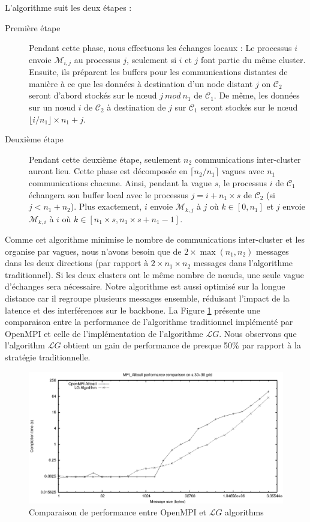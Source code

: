 L'algorithme suit les deux étapes : 
\begin{description}
	\item[Première étape] Pendant cette phase, nous effectuons les échanges locaux : Le processus $i$  envoie ${\mathcal M}_{i,j}$ au processus $j$, seulement si $i$ et $j$ font partie du même cluster. Ensuite, ils préparent les buffers pour les communications distantes de manière à ce que les données à destination d'un node distant $j$ on ${\mathcal C}_2$ seront d'abord stockés sur le n{\oe}ud $j~ mod~ n_1$ de ${\mathcal C}_1$. De même, les données sur un n{\oe}ud $i$ de ${\mathcal C}_2$ à destination de $j$ sur ${\mathcal C}_1$ seront stockés sur le n{\oe}ud $ \lfloor i/n_1 \rfloor \times n_1 + j $.
	\item[Deuxième étape] Pendant cette deuxième étape, seulement $n_2$ communications inter-cluster auront lieu. Cette phase est décomposée en $\lceil n_2/n_1\rceil$ vagues avec $n_1$ communications chacune. Ainsi, pendant la vague $s$, le processus  $i$ de ${\mathcal C}_1$ échangera son buffer local avec le processus $j=i+n_1\times s$ de ${\mathcal C}_2$ (si $j < n_1+n_2$). Plus exactement, $i$ envoie  ${\mathcal M}_{k,j}$ à $j$ où $k\in [0,n_1]$ et $j$ envoie ${\mathcal M}_{k,i}$ à $i$ où $k\in[n_1\times s,n_1\times s+n_1-1]$.
\end{description}

Comme cet algorithme minimise le nombre de communications inter-cluster et les organise par vagues, nous n'avons besoin que de $2\times \max(n_1,n_2)$ messages dans les deux directions (par rapport à  $2\times n_1 \times n_2$ messages dans l'algorithme traditionnel). Si les deux clusters ont le même nombre de n{\oe}uds, une seule vague d'échanges sera nécessaire. Notre algorithme est aussi optimisé sur la longue distance car il regroupe plusieurs messages ensemble, réduisant l'impact de la latence et des interférences sur le backbone. La Figure \ref{Figure: comp} présente une comparaison entre la performance de l'algorithme traditionnel implémenté par OpenMPI et celle de l'implémentation de l'algorithme ${\mathcal LG}$. Nous observons que l'algorithm ${\mathcal LG}$ obtient un gain de performance de presque 50\% par rapport à la stratégie traditionnelle.

\begin{figure}
	\begin{center}\includegraphics[width=0.7\columnwidth]{images/comp}\end{center}
	\caption{\label{Figure: comp}Comparaison de performance entre OpenMPI et ${\mathcal LG}$ algorithms}
\end{figure}

